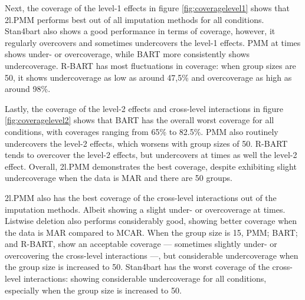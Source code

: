 \documentclass[preprint,12pt]{elsarticle}
\begin{document}
Next, the coverage of the level-1 effects in figure \ref{fig:coveragelevel1} shows that 2l.PMM performs best out of all imputation methods for all conditions. Stan4bart also shows a good performance in terms of coverage, however, it regularly overcovers and sometimes undercovers the level-1 effects. PMM at times shows under- or overcoverage, while BART more consistently shows undercoverage. R-BART has most fluctuations in coverage: when group sizes are 50, it shows undercoverage as low as around 47,5\% and overcoverage as high as around 98\%.


Lastly, the coverage of the level-2 effects and cross-level interactions in figure \ref{fig:coveragelevel2} shows that BART has the overall worst coverage for all conditions, with coverages ranging from 65\% to 82.5\%. PMM also routinely undercovers the level-2 effects, which worsens with group sizes of 50. R-BART tends to overcover the level-2 effects, but undercovers at times as well the level-2 effect. Overall, 2l.PMM demonstrates the best coverage, despite exhibiting slight undercoverage when the data is MAR and there are 50 groups. 

2l.PMM also has the best coverage of the cross-level interactions out of the imputation methods. Albeit showing a slight under- or overcoverage at times. Listwise deletion also performs considerably good, showing better coverage when the data is MAR compared to MCAR. When the group size is 15, PMM; BART; and R-BART, show an acceptable coverage --- sometimes slightly under- or overcovering the cross-level interactions ---, but considerable undercoverage when the group size is increased to 50. Stan4bart has the worst coverage of the cross-level interactions: showing considerable undercoverage for all conditions, especially when the group size is increased to 50.
\end{document}
